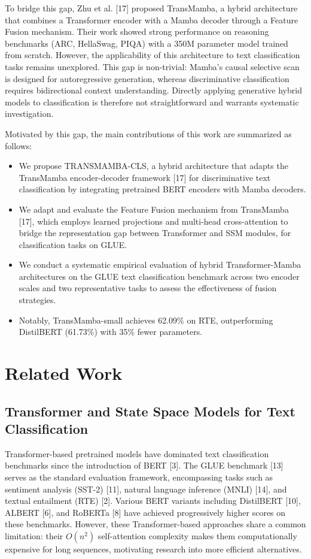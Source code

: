\documentclass[10pt, conference]{IEEEtran}
\begin{document}
To bridge this gap, Zhu et al. [17] proposed TransMamba, a hybrid architecture that combines a Transformer encoder with a Mamba decoder through a Feature Fusion mechanism. %
Their work showed strong performance on reasoning benchmarks (ARC, HellaSwag, PIQA) with a 350M parameter model trained from scratch. %
However, the applicability of this architecture to text classification tasks remains unexplored. %
This gap is non-trivial: Mamba's causal selective scan is designed for autoregressive generation, whereas discriminative classification requires bidirectional context understanding. %
Directly applying generative hybrid models to classification is therefore not straightforward and warrants systematic investigation. %

Motivated by this gap, the main contributions of this work are summarized as follows: %
\begin{itemize}
    \item We propose TRANSMAMBA-CLS, a hybrid architecture that adapts the TransMamba encoder-decoder framework [17] for discriminative text classification by integrating pretrained BERT encoders with Mamba decoders. %
    \item We adapt and evaluate the Feature Fusion mechanism from TransMamba [17], which employs learned projections and multi-head cross-attention to bridge the representation gap between Transformer and SSM modules, for classification tasks on GLUE. %
    \item We conduct a systematic empirical evaluation of hybrid Transformer-Mamba architectures on the GLUE text classification benchmark across two encoder scales and two representative tasks to assess the effectiveness of fusion strategies. %
    \item Notably, TransMamba-small achieves 62.09\% on RTE, outperforming DistilBERT (61.73\%) with 35\% fewer parameters. %
\end{itemize}

\section{Related Work} %
\subsection{Transformer and State Space Models for Text Classification} %
Transformer-based pretrained models have dominated text classification benchmarks since the introduction of BERT [3]. %
The GLUE benchmark [13] serves as the standard evaluation framework, encompassing tasks such as sentiment analysis (SST-2) [11], natural language inference (MNLI) [14], and textual entailment (RTE) [2]. %
Various BERT variants including DistilBERT [10], ALBERT [6], and RoBERTa [8] have achieved progressively higher scores on these benchmarks. %
However, these Transformer-based approaches share a common limitation: their $O(n^{2})$ self-attention complexity makes them computationally expensive for long sequences, motivating research into more efficient alternatives. %
\end{document}
